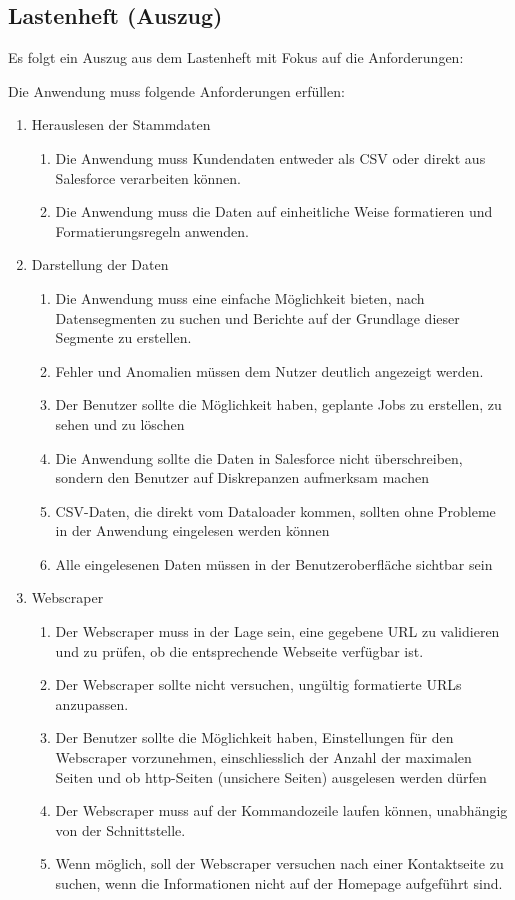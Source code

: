 
\subsection{Lastenheft (Auszug)}
\label{app:Lastenheft}
Es folgt ein Auszug aus dem Lastenheft mit Fokus auf die Anforderungen:

Die Anwendung muss folgende Anforderungen erfüllen: 
\begin{enumerate}[itemsep=0em,partopsep=0em,parsep=0em,topsep=0em]
\item Herauslesen der Stammdaten
	\begin{enumerate}
	\item Die Anwendung muss Kundendaten entweder als CSV oder direkt aus Salesforce verarbeiten können.
	\item Die Anwendung muss die Daten auf einheitliche Weise formatieren und Formatierungsregeln anwenden.
	\end{enumerate}
\item Darstellung der Daten
	\begin{enumerate}
	\item Die Anwendung muss eine einfache Möglichkeit bieten, nach Datensegmenten zu suchen und Berichte auf der Grundlage dieser Segmente zu erstellen.
	\item Fehler und Anomalien müssen dem Nutzer deutlich angezeigt werden.
	\item Der Benutzer sollte die Möglichkeit haben, geplante Jobs zu erstellen, zu sehen und zu löschen
	\item Die Anwendung sollte die Daten in Salesforce nicht überschreiben, sondern den Benutzer auf Diskrepanzen aufmerksam machen
	\item CSV-Daten, die direkt vom Dataloader kommen, sollten ohne Probleme in der Anwendung eingelesen werden können 
 	\item Alle eingelesenen Daten müssen in der Benutzeroberfläche sichtbar sein
	\end{enumerate}
\item Webscraper
	\begin{enumerate}
	\item Der Webscraper muss in der Lage sein, eine gegebene URL zu validieren und zu prüfen, ob die entsprechende Webseite verfügbar ist.
	\item Der Webscraper sollte nicht versuchen, ungültig formatierte URLs anzupassen.
	\item Der Benutzer sollte die Möglichkeit haben, Einstellungen für den Webscraper vorzunehmen, einschliesslich der Anzahl der maximalen Seiten und ob http-Seiten (unsichere Seiten) ausgelesen werden dürfen
	\item Der Webscraper muss auf der Kommandozeile laufen können, unabhängig von der Schnittstelle.
    \item Wenn möglich, soll der Webscraper versuchen nach einer Kontaktseite zu suchen, wenn die Informationen nicht auf der Homepage aufgeführt sind.
\end{enumerate}
	

\end{enumerate}
